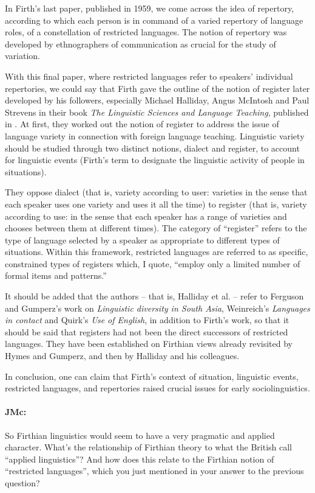 \documentclass[output=paper]{langscibook}
\begin{document}
In Firth’s last paper, published in 1959, we come across the idea of repertory, according to which each person is in command of a varied repertory of language roles, of a constellation of restricted languages. The notion of repertory was developed by ethnographers of communication as crucial for the study of variation.

With this final paper, where restricted languages refer to speakers’ individual repertories, we could say that Firth gave the outline of the notion of register later developed by his followers, especially Michael Halliday, Angus McIntosh and Paul Strevens in their book \textit{The Linguistic Sciences and Language Teaching}, published in \citeyear{halliday1964a}. At first, they worked out the notion of register to address the issue of language variety in connection with foreign language teaching. Linguistic variety should be studied through two distinct notions, dialect and register, to account for linguistic events (Firth’s term to designate the linguistic activity of people in situations).

They oppose dialect (that is, variety according to user: varieties in the sense that each speaker uses one variety and uses it all the time) to register (that is, variety according to use: in the sense that each speaker has a range of varieties and chooses between them at different times). The category of “register” refers to the type of language selected by a speaker as appropriate to different types of situations. Within this framework, restricted languages are referred to as specific, constrained types of registers which, I quote, “employ only a limited number of formal items and patterns.”

It should be added that the authors – that is, Halliday et al. – refer to Ferguson and Gumperz’s work on \textit{Linguistic diversity in South Asia}, Weinreich’s \textit{Languages in contact} and Quirk’s \textit{Use of English}, in addition to Firth’s work, so that it should be said that registers had not been the direct successors of restricted languages. They have been established on Firthian views already revisited by Hymes and Gumperz, and then by Halliday and his colleagues.

In conclusion, one can claim that Firth’s context of situation, linguistic events, restricted languages, and repertories raised crucial issues for early sociolinguistics.

\paragraph*{JMc:} So Firthian linguistics would seem to have a very pragmatic and applied character. What’s the relationship of Firthian theory to what the British call “applied linguistics”? And how does this relate to the Firthian notion of “restricted languages”, which you just mentioned in your answer to the previous question?
\end{document}
